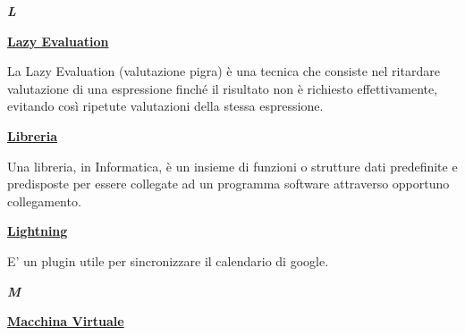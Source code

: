 \newpage

\cleardoublepage
{}
{}
\noindent\hrulefill\hspace{4mm}\textbf{\textsl{\Huge{L}}}\hspace{4mm}\hrulefill

\vspace*{2\bigskipamount}

\begin{addmargin}[0em]{0em}	
	\textbf{\underline{Lazy Evaluation}}
\end{addmargin}

\medskip
\begin{addmargin}[5em]{1em}	
La Lazy Evaluation (valutazione pigra) è una tecnica che consiste nel ritardare valutazione di una espressione finché il risultato non è richiesto effettivamente, evitando così ripetute valutazioni della stessa espressione.
\end{addmargin}	


\bigskip
\begin{addmargin}[0em]{0em}	
	\textbf{\underline{Libreria}}
\end{addmargin}

\medskip
\begin{addmargin}[5em]{1em}	
Una libreria, in Informatica, è un insieme di funzioni o strutture dati predefinite e predisposte per essere collegate ad un programma software attraverso opportuno collegamento.
\end{addmargin}	


\bigskip
\begin{addmargin}[0em]{0em}	
	\textbf{\underline{Lightning}}
\end{addmargin}
	
\medskip
\begin{addmargin}[5em]{1em}	
E' un plugin utile per sincronizzare il calendario di google.
\end{addmargin}


\newpage

\cleardoublepage
{}
{}
\noindent\hrulefill\hspace{4mm}\textbf{\textsl{\Huge{M}}}\hspace{4mm}\hrulefill

\vspace*{2\bigskipamount}

\begin{addmargin}[0em]{0em}	
	\textbf{\underline{Macchina Virtuale}} 
\end{addmargin}


